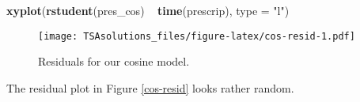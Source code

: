 \documentclass[]{book}
\newenvironment{Shaded}{\begin{snugshade}}{\end{snugshade}}
\newcommand{\KeywordTok}[1]{\textcolor[rgb]{0.13,0.29,0.53}{\textbf{{#1}}}}
\newcommand{\DataTypeTok}[1]{\textcolor[rgb]{0.13,0.29,0.53}{{#1}}}
\newcommand{\StringTok}[1]{\textcolor[rgb]{0.31,0.60,0.02}{{#1}}}
\newcommand{\NormalTok}[1]{{#1}}
\theoremstyle{definition}
\theoremstyle{definition}
\theoremstyle{remark}
\begin{document}
\begin{Shaded}
\begin{Highlighting}[]
\KeywordTok{xyplot}\NormalTok{(}\KeywordTok{rstudent}\NormalTok{(pres_cos) ~}\StringTok{ }\KeywordTok{time}\NormalTok{(prescrip), }\DataTypeTok{type =} \StringTok{"l"}\NormalTok{)}
\end{Highlighting}
\end{Shaded}

\begin{figure}[htbp]
\centering
\texttt{[image: TSAsolutions\_files/figure-latex/cos-resid-1.pdf]}
\caption{\label{fig:cos-resid}Residuals for our cosine model.}
\end{figure}

The residual plot in Figure \ref{cos-resid} looks rather random.
\end{document}
